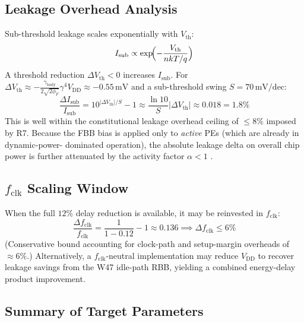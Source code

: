 \documentclass[12pt,a4paper]{report}
\theoremstyle{plain}
\theoremstyle{definition}
\theoremstyle{remark}
\newcommand{\vdd}{V_{\mathrm{DD}}}
\newcommand{\gammaFour}{\gamma^{4}}
\newcommand{\fclk}{f_{\mathrm{clk}}}
\begin{document}
\subsection{Leakage Overhead Analysis}

Sub-threshold leakage scales exponentially with $V_{\mathrm{th}}$:
\begin{equation}
  I_{\mathrm{sub}} \propto \exp\!\Bigl(-\frac{V_{\mathrm{th}}}{n k T / q}\Bigr)
  \label{eq:isub}
\end{equation}
A threshold reduction $\Delta V_{\mathrm{th}} < 0$ increases $I_{\mathrm{sub}}$.  For
$\Delta V_{\mathrm{th}} \approx -\frac{\gamma_{\mathrm{body}}}{2\sqrt{2\phi_{F}}} \gammaFour \vdd
\approx -0.55\,\mathrm{mV}$ and a sub-threshold swing $S = 70\,\mathrm{mV/dec}$:
\begin{equation}
  \frac{\Delta I_{\mathrm{sub}}}{I_{\mathrm{sub}}} = 10^{|\Delta V_{\mathrm{th}}|/S} - 1
  \approx \frac{\ln 10}{S} |\Delta V_{\mathrm{th}}| \approx 0.018 = 1.8\%
\end{equation}
This is well within the constitutional leakage overhead ceiling of $\leq 8\%$ imposed by R7.
Because the FBB bias is applied only to \emph{active} PEs (which are already in dynamic-power-
dominated operation), the absolute leakage delta on overall chip power is further attenuated by
the activity factor $\alpha < 1$ \citep{mukhopadhyay_2009}.

\subsection{$\fclk$ Scaling Window}

When the full $12\%$ delay reduction is available, it may be reinvested in $\fclk$:
\begin{equation}
  \frac{\Delta \fclk}{\fclk} = \frac{1}{1 - 0.12} - 1 \approx 0.136 \implies \Delta \fclk \leq 6\%
\end{equation}
(Conservative bound accounting for clock-path and setup-margin overheads of $\approx 6\%$.)
Alternatively, a $\fclk$-neutral implementation may reduce $\vdd$ to recover leakage savings
from the W47 idle-path RBB, yielding a combined energy-delay product improvement.

\subsection{Summary of Target Parameters}
\end{document}
